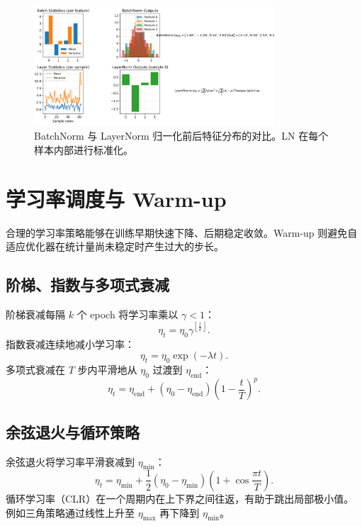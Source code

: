 \documentclass[UTF8,zihao=-4]{ctexart}
\begin{document}
\begin{figure}[H]
  \centering
  \includegraphics[width=0.8\textwidth]{normalization_comparison.png}
  \caption{BatchNorm 与 LayerNorm 归一化前后特征分布的对比。LN 在每个样本内部进行标准化。}
  \label{fig:normalization_comparison_cn}
\end{figure}
\FloatBarrier

\section{学习率调度与 Warm-up}
合理的学习率策略能够在训练早期快速下降、后期稳定收敛。Warm-up 则避免自适应优化器在统计量尚未稳定时产生过大的步长。

\subsection{阶梯、指数与多项式衰减}
阶梯衰减每隔 $k$ 个 epoch 将学习率乘以 $\gamma < 1$：
\begin{equation}
  \eta_t = \eta_0 \gamma^{\left\lfloor \frac{t}{k} \right\rfloor}.
\end{equation}
指数衰减连续地减小学习率：
\begin{equation}
  \eta_t = \eta_0 \exp(-\lambda t).
\end{equation}
多项式衰减在 $T$ 步内平滑地从 $\eta_0$ 过渡到 $\eta_{\mathrm{end}}$：
\begin{equation}
  \eta_t = \eta_{\mathrm{end}} + (\eta_0 - \eta_{\mathrm{end}})\left(1 - \frac{t}{T}\right)^{p}.
\end{equation}

\subsection{余弦退火与循环策略}
余弦退火将学习率平滑衰减到 $\eta_{\min}$：
\begin{equation}
  \eta_t = \eta_{\min} + \frac{1}{2}(\eta_0 - \eta_{\min})\left(1 + \cos\frac{\pi t}{T}\right).
\end{equation}
循环学习率（CLR）在一个周期内在上下界之间往返，有助于跳出局部极小值。例如三角策略通过线性上升至 $\eta_{\max}$ 再下降到 $\eta_{\min}$。
\end{document}
